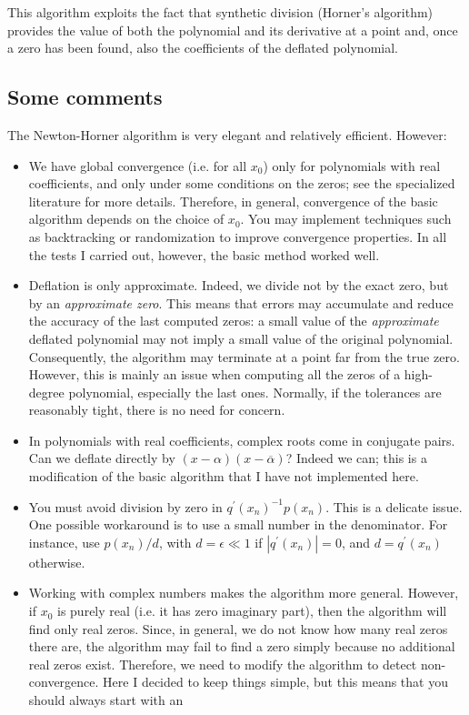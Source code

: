 \documentclass[10pt,a4paper]{article}
\theoremstyle{definition}%
\begin{document}
This algorithm exploits the fact that synthetic division (Horner's algorithm) provides the value of both the polynomial and its derivative at a point and, once a zero has been found, also the coefficients of the deflated polynomial. 
\subsection{Some comments}
The Newton-Horner algorithm is very elegant and relatively efficient. However:
\begin{itemize}
    \item We have global convergence (i.e. for all $x_0$) only for polynomials with real coefficients, and only under some conditions on the zeros; see the specialized literature for more details. Therefore, in general, convergence of the basic algorithm depends on the choice of $x_0$. You may implement techniques such as backtracking or randomization to improve convergence properties. In all the tests I carried out, however, the basic method worked well.
    \item Deflation is only approximate. Indeed, we divide not by the exact zero, but by an \emph{approximate zero}. This means that errors may accumulate and reduce the accuracy of the last computed zeros: a small value of the \emph{approximate} deflated polynomial may not imply a small value of the original polynomial. Consequently, the algorithm may terminate at a point far from the true zero. 
    However, this is mainly an issue when computing all the zeros of a high-degree polynomial, especially the last ones. Normally, if the tolerances are reasonably tight, there is no need for concern. 
    \item In polynomials with real coefficients, complex roots come in conjugate pairs. Can we deflate directly by $(x-\alpha)(x-\overline{\alpha})$?
    Indeed we can; this is a modification of the basic algorithm that I have not implemented here.
    \item You must avoid division by zero in $q^\prime(x_n)^{-1}p(x_n)$.
    This is a delicate issue. One possible workaround is to use a small number in the denominator. For instance, use $p(x_n)/d$, with $d=\epsilon \ll 1$ if $|q^\prime(x_n)|=0$, and $d=q^\prime(x_n)$ otherwise. 
    \item Working with complex numbers makes the algorithm more general. However, if $x_0$ is purely real (i.e. it has zero imaginary part), then the algorithm will find only real zeros. Since, in general, we do not know how many real zeros there are, the algorithm may fail to find a zero simply because no additional real zeros exist. Therefore, we need to modify the algorithm to detect non-convergence. Here I decided to keep things simple, but this means that you should always start with an 

\end{itemize}
\end{document}

